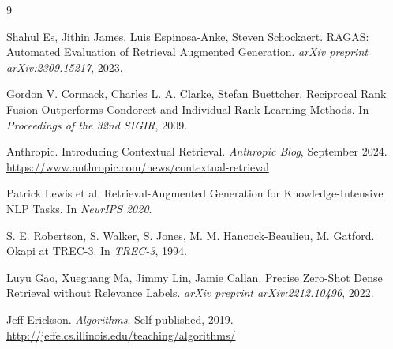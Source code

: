 \documentclass[12pt,a4paper]{article}
\begin{document}
\begin{thebibliography}{9}

Shahul Es, Jithin James, Luis Espinosa-Anke, Steven Schockaert.
\newblock RAGAS: Automated Evaluation of Retrieval Augmented Generation.
\newblock \textit{arXiv preprint arXiv:2309.15217}, 2023.

Gordon V. Cormack, Charles L. A. Clarke, Stefan Buettcher.
\newblock Reciprocal Rank Fusion Outperforms Condorcet and Individual Rank Learning Methods.
\newblock In \textit{Proceedings of the 32nd SIGIR}, 2009.

Anthropic.
\newblock Introducing Contextual Retrieval.
\newblock \textit{Anthropic Blog}, September 2024.
\newblock \url{https://www.anthropic.com/news/contextual-retrieval}

Patrick Lewis et al.
\newblock Retrieval-Augmented Generation for Knowledge-Intensive NLP Tasks.
\newblock In \textit{NeurIPS 2020}.

S. E. Robertson, S. Walker, S. Jones, M. M. Hancock-Beaulieu, M. Gatford.
\newblock Okapi at TREC-3.
\newblock In \textit{TREC-3}, 1994.

Luyu Gao, Xueguang Ma, Jimmy Lin, Jamie Callan.
\newblock Precise Zero-Shot Dense Retrieval without Relevance Labels.
\newblock \textit{arXiv preprint arXiv:2212.10496}, 2022.

Jeff Erickson.
\newblock \textit{Algorithms}.
\newblock Self-published, 2019.
\newblock \url{http://jeffe.cs.illinois.edu/teaching/algorithms/}

\end{thebibliography}
\end{document}
